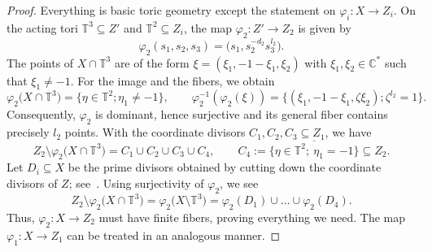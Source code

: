 \documentclass[pdftex]{sigma}
\theoremstyle{definition}
\def\CC{{\mathbb C}}
\def\TT{{\mathbb T}}
\begin{document}
\begin{proof}
Everything is basic toric geometry except the statement
on $\varphi_i \colon X \to Z_i$.
On the acting tori $\TT^3 \subseteq Z'$ and $\TT^2 \subseteq Z_i$,
the map $\varphi_2 \colon Z' \to Z_2$ is given by
\[
\varphi_2(s_1,s_2,s_3) = \bigl( s_1, s_2^{-d_2}s_3^{l_2} \bigr).
\]
The points of $X \cap \TT^3$ are of the form
$\xi = (\xi_1, -1-\xi_1, \xi_2)$ with
$\xi_1, \xi_2 \in \CC^*$ such that $\xi_1 \ne -1$.
For the image and the fibers, we obtain
\[
\varphi_2\bigl(X \cap \TT^3\bigr)
=
\bigl\{\eta \in \TT^2; \eta_1 \ne -1\bigr\},
\qquad
\varphi_2^{-1}(\varphi_2(\xi))
=
\bigl\{(\xi_1, -1-\xi_1, \zeta \xi_2); \zeta^{l_2} = 1\bigr\}.
\]
Consequently, $\varphi_2$ is dominant, hence surjective
and its general fiber contains precisely $l_2$ points.
With the coordinate divisors $C_1,C_2,C_3 \subseteq Z_1$,
we have
\[
Z_2 \setminus \varphi_2\bigl(X \cap \TT^3\bigr)
 =
C_1 \cup C_2 \cup C_3 \cup C_4,
\qquad
C_4
 :=
\overline{\bigl\{\eta \in \TT^2; \ \eta_1 = -1\bigr\}}
 \subseteq
Z_2.
\]
Let $D_i \subseteq X$ be the prime divisors
obtained by cutting down the coordinate divisors
of $Z$; see~\mbox{\cite[Proposition~4.9]{HaHaHaSp}}.
Using surjectivity of $\varphi_2$, we see
\[
Z_2 \setminus \varphi_2\bigl(X \cap \TT^3\bigr)
 =
\varphi_2\bigl(X \setminus \TT^3\bigr)
 =
\varphi_2(D_1) \cup \dots \cup \varphi_2(D_4).
\]
Thus, $\varphi_2 \colon X \to Z_2$ must have
finite fibers, proving everything we need.
The map $\varphi_1 \colon X \to Z_1$ can be
treated in an analogous manner.
\end{proof}
\end{document}
